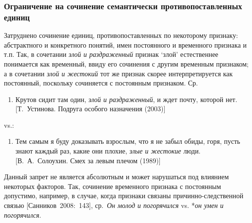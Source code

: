 \hypertarget{ux43eux433ux440ux430ux43dux438ux447ux435ux43dux438ux435-ux43dux430-ux441ux43eux447ux438ux43dux435ux43dux438ux435-ux441ux435ux43cux430ux43dux442ux438ux447ux435ux441ux43aux438-ux43fux440ux43eux442ux438ux432ux43eux43fux43eux441ux442ux430ux432ux43bux435ux43dux43dux44bux445-ux435ux434ux438ux43dux438ux446}{%
\subsubsection{Ограничение на сочинение семантически противопоставленных
единиц}\label{ux43eux433ux440ux430ux43dux438ux447ux435ux43dux438ux435-ux43dux430-ux441ux43eux447ux438ux43dux435ux43dux438ux435-ux441ux435ux43cux430ux43dux442ux438ux447ux435ux441ux43aux438-ux43fux440ux43eux442ux438ux432ux43eux43fux43eux441ux442ux430ux432ux43bux435ux43dux43dux44bux445-ux435ux434ux438ux43dux438ux446}}

Затруднено сочинение единиц, противопоставленных по некоторому признаку:
абстрактного и конкретного понятий, имен постоянного и временного
признака и т.п. Так, в сочетании \emph{злой и раздраженный} признак
`злой' естественнее понимается как временный, ввиду его сочинения с
другим временным признаком; а в сочетании \emph{злой и жестокий} тот же
признак скорее интерпретируется как постоянный, поскольку сочиняется с
постоянным признаком. Ср.

\begin{enumerate}
\def\labelenumi{(\arabic{enumi})}
\setcounter{enumi}{14}
\item
  Крутов сидит там один, \emph{злой и раздраженный}, и ждет почту,
  которой нет. {[}Т.~Устинова. Подруга особого назначения (2003){]}
\end{enumerate}

vs.:

\begin{enumerate}
\def\labelenumi{(\arabic{enumi})}
\setcounter{enumi}{15}
\item
  Тем самым я буду доказывать взрослым, что я не забыл обиды, горя,
  пусть знают каждый раз, какие они плохие, \emph{злые и жестокие} люди.
  {[}В.~А.~Солоухин. Смех за левым плечом (1989){]}
\end{enumerate}

Данный запрет не является абсолютным и может нарушаться под влиянием
некоторых факторов. Так, сочинение временного признака с постоянным
допустимо, например, в случае, когда признаки связаны
причинно-следственной связью {[}Санников~2008:~143{]}, ср.~\emph{Он
молод и погорячился} vs. *\emph{он умен и погорячился}.

